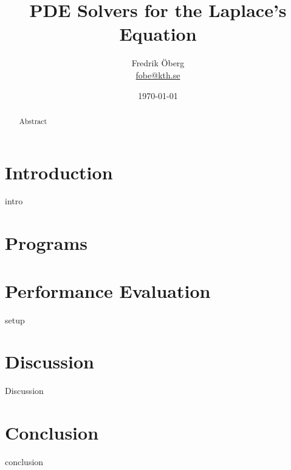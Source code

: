 \documentclass{article}
\begin{document}
\title{PDE Solvers for the Laplace's Equation}
\author{Fredrik Öberg \\ \href{mailto:fobe@kth.se}{fobe@kth.se}}
\date{\today}
\maketitle

\begin{abstract}
Abstract
\end{abstract}

\newpage
\tableofcontents
\newpage

\section{Introduction}
intro

\section{Programs}\label{programs}


\section{Performance Evaluation}\label{performanceevaluation}

setup

\newpage


\section{Discussion}\label{discussion}

Discussion


\section{Conclusion}\label{conclusion}

conclusion
\end{document}
